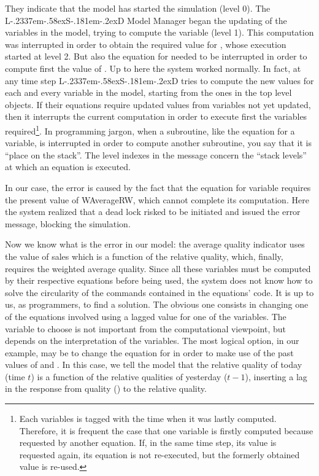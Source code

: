 \documentclass [11pt,a4paper] {book}
\def\LsD{{L\kern-.2337em\lower-.58ex\hbox{S}\kern-.181em\lower-.2ex\hbox{D}}\xspace}
\begin{document}
They indicate that the model has started the simulation (level 0). The \LsD Model Manager began the updating of the variables in the model, trying to compute the variable  (level 1). This computation was
interrupted in order to obtain the required value for , whose execution
started at level 2. But also the equation for  needed to be interrupted in
order to compute first the value of . Up to here the system worked
normally. In fact, at any time step \LsD tries to compute the new values for each and
every variable in the model, starting from the ones in the top level objects. If their
equations require updated values from variables not yet updated, then it interrupts the
current computation in order to execute first the variables required\footnote{Each
variables is tagged with the time when it was lastly computed. Therefore, it is frequent
the case that one variable is firstly computed because requested by another equation. If,
in the same time step, its value is requested again, its equation is not re-executed, but
the formerly obtained value is re-used.}. In programming jargon, when a subroutine, like
the equation for a variable, is interrupted in order to compute another subroutine, you
say that it is ``place on the stack''. The level indexes in the  message
concern the ``stack levels'' at which an equation is executed.


In our case, the error is caused by the fact that the equation for variable
 requires the present value of WAverageRW, which cannot complete its
computation. Here the system realized that a dead lock risked to be initiated and issued
the error message, blocking the simulation.


Now we know what is the error in our model: the average quality indicator uses the value
of sales which is a function of the relative quality, which, finally, requires the weighted
average quality. Since all these variables must be computed by their respective equations
before being used, the system does not know how to solve the circularity of the commands
contained in the equations' code. It is up to us, as programmers, to find a solution. The obvious one consists in changing one of the equations involved using a lagged value for one of
the variables. The variable to choose is not important from the computational viewpoint,
but depends on the interpretation of the variables. The most logical option, in our
example, may be to change the equation for  in order to make use of
the past values of  and . In this case, we tell the model
that the relative quality of today (time $t$) is a function of the relative qualities of
yesterday ($t-1$), inserting a lag in the response from quality () to the
relative quality.
\end{document}
